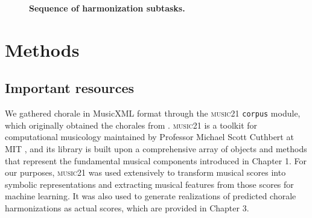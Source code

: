 \documentclass[11pt]{article}
\begin{document}
\begin{figure}[h]
\begin{center}
\caption{\textbf{Sequence of harmonization subtasks.}}
\end{center}
\end{figure}

\section{Methods}

\subsection{Important resources}

We gathered chorale in MusicXML format through the \textsc{music21} \texttt{corpus} module, which originally obtained the chorales from \citet{greentree2005}. \textsc{music21} is a toolkit for computational musicology maintained by Professor Michael Scott Cuthbert at MIT \citep{cuthbertmusic21}, and its library is built upon a comprehensive array of objects and methods that represent the fundamental musical components introduced in Chapter 1. For our purposes, \textsc{music21} was used extensively to transform musical scores into symbolic representations and extracting musical features from those scores for machine learning. It was also used to generate realizations of predicted chorale harmonizations as actual scores, which are provided in Chapter 3. \\
\end{document}
